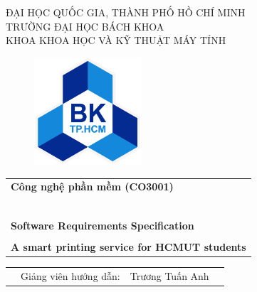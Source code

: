 \begin{titlepage}
	\begin{center}
		ĐẠI HỌC QUỐC GIA, THÀNH PHỐ HỒ CHÍ MINH \\
		TRƯỜNG ĐẠI HỌC BÁCH KHOA \\
		KHOA KHOA HỌC VÀ KỸ THUẬT MÁY TÍNH
	\end{center}

	\begin{figure}[h!]
		\begin{center}
			\includegraphics[width=4cm]{Images/bachkhoa_logo.png}
		\end{center}
	\end{figure}

	\begin{center}
		\begin{tabular}{@{}p{5cm}@{}}
			\multicolumn{1}{l}{\textbf{{\Large Công nghệ phần mềm (CO3001)}}}                            \\
			~~                                                                                           \\
			\hline
			\\
			\multicolumn{1}{l}{\textbf{{\Large Software Requirements Specification }}}                   \\
			\\
			\parbox{\textwidth}{\centering \textbf{{\Huge A smart printing service for HCMUT students}}} \\

			\\
			\hline
		\end{tabular}
	\end{center}

	\vspace{2cm}

	\begin{table}[h]
		\begin{tabular}{rrll}

			\hspace{5 cm} & Giảng viên hướng dẫn: & Trương Tuấn Anh     &         \\


\end{tabular}
\end{table}
\end{titlepage}
